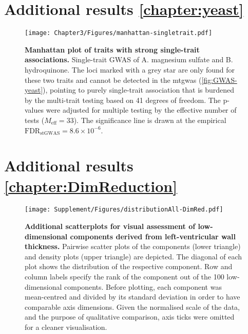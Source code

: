 \newpage
\section{Additional results \cref{chapter:yeast}}
\begin{figure}[hbtp]
	\centering
	\texttt{[image: Chapter3/Figures/manhattan-singletrait.pdf]}
	\caption[\textbf{Manhattan plot of traits with strong single-trait associations.}]{\textbf{Manhattan plot of traits with strong single-trait associations.} Single-trait GWAS of A. magnesium sulfate and B. hydroquinone. The loci marked with a grey star are only found for these two traits and cannot be detected in the \gls{mtgwas} (\cref{fig:GWAS-yeast}), pointing to purely single-trait association that is burdened by the multi-trait testing based on \num{41} degrees of freedom. The  p-values were adjusted for multiple testing by the effective number of tests (\(M_\text{eff} = 33\)). The significance line is drawn at the empirical \(\text{FDR}_{\text{stGWAS}} =8.6 \times 10^{-6}\).}
 	\label{fig:stGWAS-yeast}
\end{figure}

\newpage
\section{Additional results \cref{chapter:DimReduction}}
\begin{figure}[hbtp]
	\centering
	\texttt{[image: Supplement/Figures/distributionAll-DimRed.pdf]}
	\caption[\textbf{Additional scatterplots for visual assessment of low-dimensional components derived from left-ventricular wall thickness. }]{\textbf{Additional scatterplots for visual assessment of low-dimensional components derived from left-ventricular wall thickness. }Pairwise scatter plots of the components (lower triangle) and density plots (upper triangle) are depicted. The diagonal of each plot shows the distribution of the respective component. Row and column labels specify the rank of the component out of the \num{100} low-dimensional components. Before plotting, each component was mean-centred and divided by its standard deviation in order to have comparable axis dimensions. Given the normalised scale of the data, and the purpose of qualitative comparison, axis ticks were omitted for a cleaner visualisation. }
	 	\label{fig:distributionAll-DimRed}
\end{figure}

\newpage
